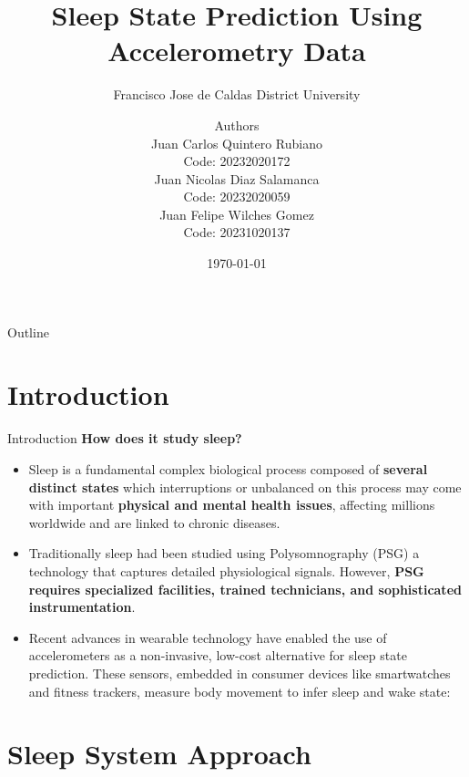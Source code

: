\documentclass[10pt]{beamer} %
\title{Sleep State Prediction Using Accelerometry Data\space } %
\subtitle{Francisco Jose de Caldas District University} %
\date{\footnotesize \today} %
\author[Authors]{Authors \\ Juan Carlos Quintero Rubiano \\ Code: 20232020172
                \\ Juan Nicolas Diaz Salamanca \\ Code: 20232020059 
                \\ Juan Felipe Wilches Gomez \\ Code: 20231020137} %
\institute{Francisco Jose de Caldas District University} %
\begin{document}
\maketitle %

\begin{frame}[plain]{Outline} %
   \tableofcontents %
\end{frame}
\section{Introduction}
\begin{frame}{Introduction} %
\normalsize \centering \textbf{How does it study sleep?}
 \begin{itemize}
     \item \footnotesize Sleep is a fundamental complex biological process composed of \textbf{several distinct states} which interruptions  or unbalanced on this process may come with important  \textbf{physical and mental health issues}, affecting millions worldwide and are linked to chronic diseases.
     \item \footnotesize Traditionally sleep had been studied using Polysomnography (PSG) a technology that captures detailed physiological signals. However, \textbf{PSG requires specialized facilities,
     trained technicians, and sophisticated instrumentation}.
     \item Recent advances in wearable technology have enabled the use of accelerometers as a non-invasive, low-cost alternative for sleep state prediction. These sensors, embedded in consumer devices like smartwatches and fitness trackers, measure body movement to infer sleep and wake state:
 \end{itemize}
        
\end{frame}

\section{Sleep System Approach}
\end{document}
